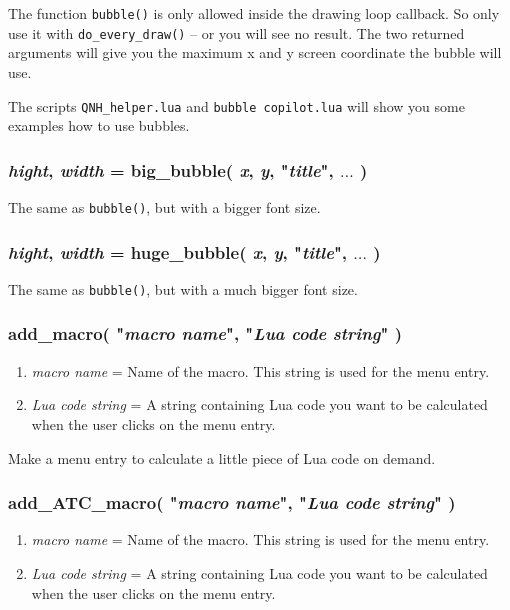 \documentclass[11pt,parskip=half,a4paper]{scrartcl}
\begin{document}
The function \verb|bubble()| is only allowed inside the drawing loop callback. So only use it with \verb|do_every_draw()| -- or you will see no result. The two returned arguments will give you the maximum x and y screen coordinate the bubble will use.

The scripts \verb|QNH_helper.lua| and \verb|bubble copilot.lua| will show you some examples how to use bubbles.

\subsubsection{\emph{hight}, \emph{width} = big\_bubble( \emph{x}, \emph{y}, "\emph{title}", $\dots$ )}

The same as \verb|bubble()|, but with a bigger font size.

\subsubsection{\emph{hight}, \emph{width} = huge\_bubble( \emph{x}, \emph{y}, "\emph{title}", $\dots$ )}

The same as \verb|bubble()|, but with a much bigger font size.



\subsubsection{add\_macro( "\emph{macro name}", "\emph{Lua code string}" )}

\begin{enumerate}
	\item \emph{macro name} = Name of the macro. This string is used for the menu entry.
	\item \emph{Lua code string} = A string containing Lua code you want to be calculated when the user clicks on the menu entry.
\end{enumerate}

Make a menu entry to calculate a little piece of Lua code on demand.

\subsubsection{add\_ATC\_macro( "\emph{macro name}", "\emph{Lua code string}" )}

\begin{enumerate}
	\item \emph{macro name} = Name of the macro. This string is used for the menu entry.
	\item \emph{Lua code string} = A string containing Lua code you want to be calculated when the user clicks on the menu entry.
\end{enumerate}
\end{document}
